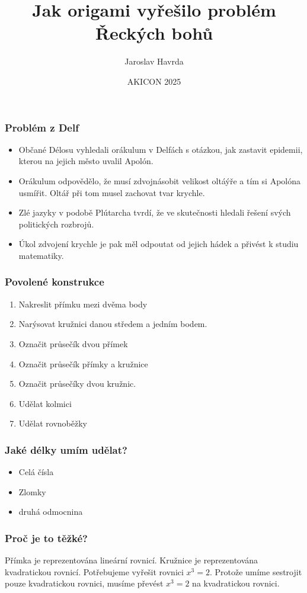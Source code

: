 \documentclass{beamer}
\title{Jak origami vyřešilo problém Řeckých bohů}
\author{Jaroslav Havrda}
\date[AKICon]{AKICON 2025}
\begin{document}
\begin{frame}
	\titlepage
\end{frame}

\begin{frame}
	\frametitle{Problém z Delf}
	\begin{itemize}
		\item Občané Délosu vyhledali orákulum v Delfách s otázkou, jak zastavit epidemii, kterou na jejich město uvalil Apolón.
		\pause
		\item Orákulum odpovědělo, že musí zdvojnásobit velikost oltáýře a tím si Apolóna usmířit. Oltář při tom musel zachovat tvar krychle.
		\pause

		\item Zlé jazyky v podobě Plútarcha tvrdí, že ve skutečnosti hledali řešení svých politických rozbrojů.
		\pause
		\item Úkol zdvojení krychle je pak měl odpoutat od jejich hádek a přivést k studiu matematiky.
		\pause
	\end{itemize}
\end{frame}

\begin{frame}
	\frametitle{Povolené konstrukce}
	\begin{enumerate}
		\item Nakreslit přímku mezi dvěma body
		\item Narýsovat kružnici danou středem a jedním bodem.
		\item Označit průsečík dvou přímek
		\item Označit průsečík přímky a kružnice
		\item Označit průsečíky dvou kružnic.
		\item Udělat kolmici
		\item Udělat rovnoběžky
	\end{enumerate}
\end{frame}

\begin{frame}
	\frametitle{Jaké délky umím udělat?}
	\begin{itemize}
		\item Celá čísla
		\item Zlomky
		\item druhá odmocnina
	\end{itemize}
\end{frame}

\begin{frame}
	\frametitle{Proč je to těžké?}
	Přímka je reprezentována lineární rovnicí.
	Kružnice je reprezentována kvadratickou rovnicí.
	Potřebujeme vyřešit rovnici \(x^3 = 2\).
	Protože umíme sestrojit pouze kvadratickou rovnici, musíme převést \(x^3=2\) na kvadratickou rovnici.
\end{frame}
\end{document}
